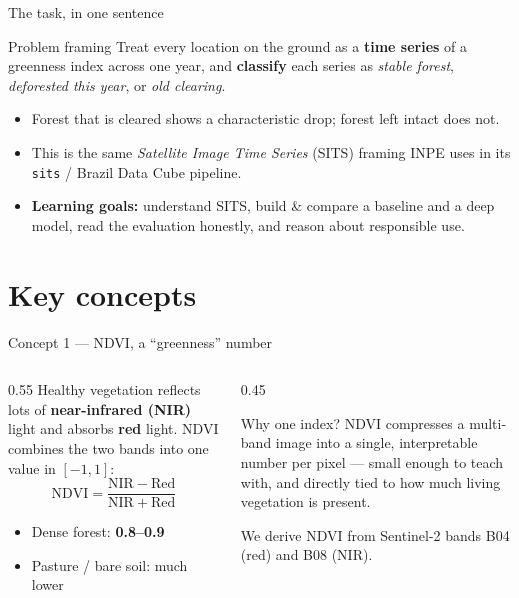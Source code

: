 \documentclass[aspectratio=169,11pt]{beamer}
\newcommand{\src}[1]{{\scriptsize\color{inkgrey}#1}}
\newcommand{\gtag}[1]{{\color{forestgreen}\textbf{#1}}}
\begin{document}
\begin{frame}{The task, in one sentence}
  \begin{block}{Problem framing}
    Treat every location on the ground as a \gtag{time series} of a greenness
    index across one year, and \gtag{classify} each series as
    \emph{stable forest}, \emph{deforested this year}, or \emph{old clearing}.
  \end{block}
  \begin{itemize}
    \item Forest that is cleared shows a characteristic \alert{drop}; forest
          left intact does not.
    \item This is the same \emph{Satellite Image Time Series} (SITS) framing
          INPE uses in its \texttt{sits} / Brazil Data Cube pipeline.
    \item \textbf{Learning goals:} understand SITS, build \& compare a baseline
          and a deep model, read the evaluation honestly, and reason about
          responsible use.
  \end{itemize}
\end{frame}

\section{Key concepts}

\begin{frame}{Concept 1 — NDVI, a ``greenness'' number}
  \begin{columns}[T]
    \begin{column}{0.55\textwidth}
      Healthy vegetation reflects lots of \textbf{near-infrared (NIR)} light and
      absorbs \textbf{red} light. NDVI combines the two bands into one value in
      $[-1, 1]$:
      \[
        \mathrm{NDVI} = \frac{\mathrm{NIR} - \mathrm{Red}}{\mathrm{NIR} + \mathrm{Red}}
      \]
      \begin{itemize}
        \item Dense forest: \gtag{0.8–0.9}
        \item Pasture / bare soil: \alert{much lower}
      \end{itemize}
    \end{column}
    \begin{column}{0.45\textwidth}
      \begin{exampleblock}{Why one index?}
        NDVI compresses a multi-band image into a single, interpretable number
        per pixel — small enough to teach with, and directly tied to how much
        living vegetation is present.
      \end{exampleblock}
      \src{We derive NDVI from Sentinel-2 bands B04 (red) and B08 (NIR).}
    \end{column}
  \end{columns}
\end{frame}
\end{document}
